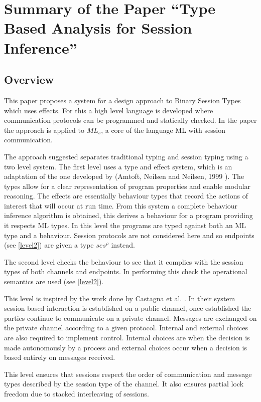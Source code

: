 \chapter{Summary of the Paper ``Type Based Analysis for Session Inference''}

\section{Overview} \label{overview}
This paper\cite{paper1} proposes a system for a design approach to Binary Session Types which uses effects. For this a high level language is developed where communication protocols can be programmed and statically checked. In the paper the approach is applied to $ML_s$, a core of the language ML with session communication.

The approach suggested separates traditional typing and session typing using a two level system. The first level uses a type and effect system, which is an adaptation of the one developed by (Amtoft, Neilsen and Neilsen, 1999 )\cite{amtoft}. The types allow for a clear representation of program properties and enable modular reasoning. The effects are essentially behaviour types that record the actions of interest that will occur at run time. From this system a complete behaviour inference algorithm is obtained, this derives a behaviour for a program providing it respects ML types. In this level the programs are typed against both an ML type and a behaviour. Session protocols are not considered here and so endpoints (see \ref{level2}) are given a type $ses^\rho$ instead.   

The second level checks the behaviour to see that it complies with the session types of both channels and endpoints. In performing this check the operational semantics are used (see \ref{level2}). 

This level is inspired by the work done by Castagna et al. \cite{foundSessTypes}. In their system session based interaction is established on a public channel, once established the parties continue to communicate on a private channel. Messages are exchanged on the private channel according to a given protocol. Internal and external choices are also required to implement control. Internal choices are when the decision is made autonomously by a process and external choices occur when a decision is based entirely on messages received. 

This level ensures that sessions respect the order of communication and message types described by the session type of the channel. It also ensures partial lock freedom due to stacked interleaving of sessions. 

